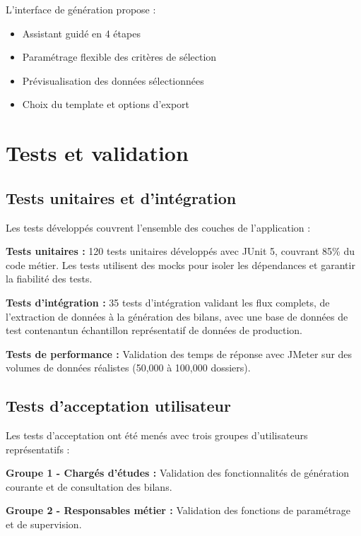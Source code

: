 L'interface de génération propose :
\begin{itemize}
    \item Assistant guidé en 4 étapes
    \item Paramétrage flexible des critères de sélection
    \item Prévisualisation des données sélectionnées
    \item Choix du template et options d'export
\end{itemize}

\section{Tests et validation}

\subsection{Tests unitaires et d'intégration}

Les tests développés couvrent l'ensemble des couches de l'application :

\medskip

\textbf{Tests unitaires :} 120 tests unitaires développés avec JUnit 5, couvrant 85\% du code métier. Les tests utilisent des mocks pour isoler les dépendances et garantir la fiabilité des tests.

\textbf{Tests d'intégration :} 35 tests d'intégration validant les flux complets, de l'extraction de données à la génération des bilans, avec une base de données de test contenantun échantillon représentatif de données de production.

\textbf{Tests de performance :} Validation des temps de réponse avec JMeter sur des volumes de données réalistes (50,000 à 100,000 dossiers).

\subsection{Tests d'acceptation utilisateur}

Les tests d'acceptation ont été menés avec trois groupes d'utilisateurs représentatifs :

\medskip

\textbf{Groupe 1 - Chargés d'études :} Validation des fonctionnalités de génération courante et de consultation des bilans.

\textbf{Groupe 2 - Responsables métier :} Validation des fonctions de paramétrage et de supervision.

